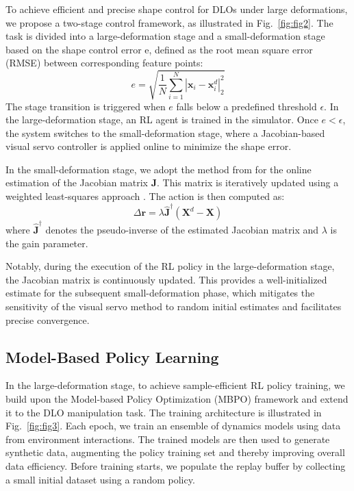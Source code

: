 \documentclass[letterpaper, 10 pt, conference]{ieeeconf}  %
\begin{document}
To achieve efficient and precise shape control for DLOs under large deformations, we propose a two-stage control framework, as illustrated in Fig.~\ref{fig:fig2}. The task is divided into a large-deformation stage and a small-deformation stage based on the shape control error e, defined as the root mean square error (RMSE) between corresponding feature points:
\begin{equation}
    e = \sqrt{\frac{1}{N} \sum_{i=1}^{N} | \mathbf{x}_i - \mathbf{x}_i^d |_2^2}
\end{equation}
The stage transition is triggered when $e$ falls below a predefined threshold $\epsilon$. In the large-deformation stage, an RL agent is trained in the simulator. Once $e < \epsilon$, the system switches to the small-deformation stage, where a Jacobian-based visual servo controller is applied online to minimize the shape error.



In the small-deformation stage, we adopt the method from \cite{zhu2018dual} for the online estimation of the Jacobian matrix ${\mathbf{J}}$. This matrix is iteratively updated using a weighted least-squares approach \cite{jin2019robust}. The action is then computed as:
\begin{equation}
\Delta \mathbf{r} = \lambda \hat{\mathbf{J}}^{\dagger} (\mathbf{X}^d - \mathbf{X})
\end{equation}
where $\hat{\mathbf{J}}^{\dagger}$ denotes the pseudo-inverse of the estimated Jacobian matrix and $\lambda$ is the gain parameter.

Notably, during the execution of the RL policy in the large-deformation stage, the Jacobian matrix is continuously updated. This provides a well-initialized estimate for the subsequent small-deformation phase, which mitigates the sensitivity of the visual servo method to random initial estimates and facilitates precise convergence.



\subsection{Model-Based Policy Learning}


In the large-deformation stage, to achieve sample-efficient RL policy training, we build upon the Model-based Policy Optimization (MBPO) framework \cite{janner2019trust} and extend it to the DLO manipulation task. The training architecture is illustrated in Fig.~\ref{fig:fig3}. Each  epoch, we train an ensemble of dynamics models using data from environment interactions. The trained models are then used to generate synthetic data, augmenting the policy training set and thereby improving overall data efficiency. Before training starts, we populate the replay buffer by collecting a small initial dataset using a random policy.
\end{document}
